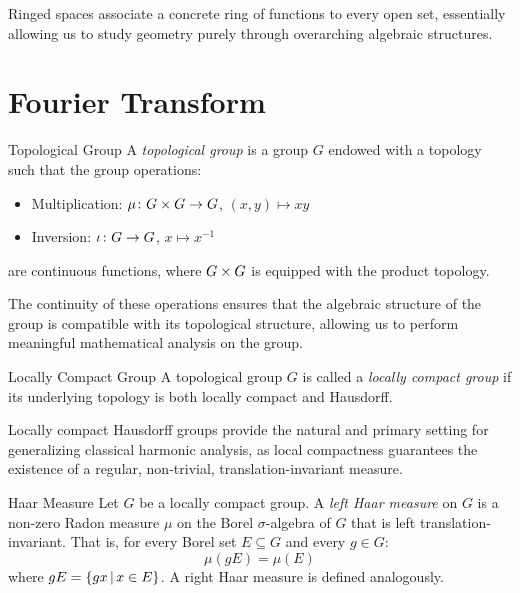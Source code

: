 \documentclass[a4paper]{article}
\begin{document}
Ringed spaces associate a concrete ring of functions to every open set, essentially allowing us to study geometry purely through overarching algebraic structures.

\section{Fourier Transform}

\begin{snippetdefinition}{Topological Group}
    A \emph{topological group} is a group \(G\) endowed with a topology such that the group operations:
    \begin{itemize}
        \item Multiplication: \(\mu \colon G \times G \to G\), \((x, y) \mapsto xy\)
        \item Inversion: \(\iota \colon G \to G\), \(x \mapsto x^{-1}\)
    \end{itemize}
    are continuous functions, where \(G \times G\) is equipped with the product topology.
\end{snippetdefinition}

The continuity of these operations ensures that the algebraic structure of the group is compatible with its topological structure, allowing us to perform meaningful mathematical analysis on the group.

\begin{snippetdefinition}{Locally Compact Group}
    A topological group \(G\) is called a \emph{locally compact group} if its underlying topology is both locally compact and Hausdorff.
\end{snippetdefinition}

Locally compact Hausdorff groups provide the natural and primary setting for generalizing classical harmonic analysis, as local compactness guarantees the existence of a regular, non-trivial, translation-invariant measure.

\begin{snippetdefinition}{Haar Measure}
    Let \(G\) be a locally compact group. A \emph{left Haar measure} on \(G\) is a non-zero Radon measure \(\mu\) on the Borel \(\sigma\)-algebra of \(G\) that is left translation-invariant. That is, for every Borel set \(E \subseteq G\) and every \(g \in G\):
    \[
        \mu(gE) = \mu(E)
    \]
    where \(gE = \{gx \,|\, x \in E\}\). A right Haar measure is defined analogously.
\end{snippetdefinition}
\end{document}
